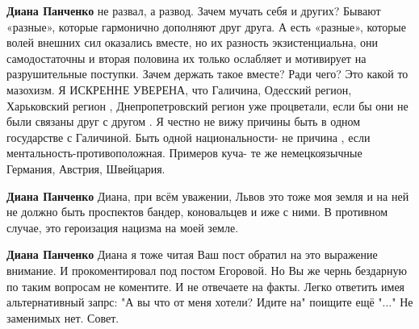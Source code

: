 \begin{itemize}
\begin{itemize}
 
\textbf{Диана Панченко} не развал, а развод. Зачем мучать себя и других? Бывают
«разные», которые гармонично дополняют друг друга. А есть «разные», которые
волей внешних сил оказались вместе, но их разность экзистенциальна, они
самодостаточны и вторая половина их только ослабляет и мотивирует на
разрушительные поступки. Зачем держать такое вместе? Ради чего? Это какой то
мазохизм. Я ИСКРЕННЕ УВЕРЕНА, что Галичина, Одесский регион, Харьковский регион
, Днепропетровский регион уже процветали, если бы они не были связаны друг с
другом . Я честно не вижу причины быть в одном государстве с Галичиной. Быть
одной национальности- не причина , если ментальность-противоположная. Примеров
куча- те же немецкоязычные Германия, Австрия, Швейцария.

 
\textbf{Диана Панченко}  Диана, при всём уважении, Львов это тоже моя земля и
на ней не должно быть проспектов бандер, коновальцев и иже с ними. В противном
случае, это героизация нацизма на моей земле.

 
\textbf{Диана Панченко} Диана я тоже читая Ваш пост обратил на это выражение
внимание. И прокоментировал под постом Егоровой. Но Вы же чернь бездарную по
таким вопросам не коментите. И не отвечаете на факты. Легко ответить имея
альтернативный запрс: "А вы что от меня хотели? Идите на" поищите ещё "..." Не
заменимых нет. Совет.

 

\end{itemize}
\end{itemize}
